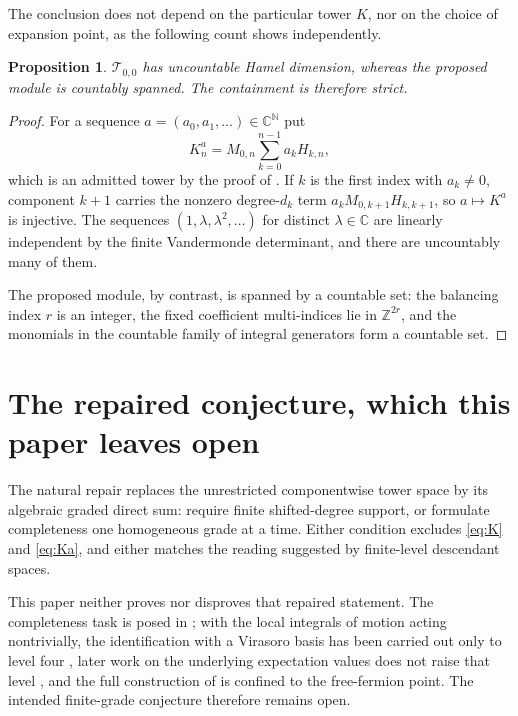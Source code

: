 \documentclass[11pt,reqno]{amsart}
\theoremstyle{plain}
\newtheorem{proposition}[theorem]{Proposition}
\theoremstyle{definition}
\theoremstyle{remark}
\numberwithin{equation}{section}
\begin{document}
The conclusion does not depend on the particular tower $K$, nor on the
choice of expansion point, as the following count shows independently.

\begin{proposition}
  \label{prop:dimension}
  $\mathcal T_{0,0}$ has uncountable Hamel dimension, whereas the proposed
  module is countably spanned. The containment is therefore strict.
\end{proposition}

\begin{proof}
  For a sequence $a=(a_0,a_1,\dots)\in\mathbb C^{\mathbb N}$ put
  \begin{equation}
    \label{eq:Ka}
    K^a_n=M_{0,n}\sum_{k=0}^{n-1}a_kH_{k,n},
  \end{equation}
  which is an admitted tower by the proof of . If $k$ is
  the first index with $a_k\ne0$, component $k+1$ carries the nonzero
  degree-$d_k$ term $a_kM_{0,k+1}H_{k,k+1}$, so $a\mapsto K^a$ is injective.
  The sequences $(1,\lambda,\lambda^2,\dots)$ for distinct
  $\lambda\in\mathbb C$ are linearly independent by the finite Vandermonde
  determinant, and there are uncountably many of them.

  The proposed module, by contrast, is spanned by a countable set: the
  balancing index $r$ is an integer, the fixed coefficient multi-indices lie
  in $\mathbb Z^{2r}$, and the monomials in the countable family of integral
  generators form a countable set.
\end{proof}

\section{The repaired conjecture, which this paper leaves open}
\label{sec:repair}

The natural repair replaces the unrestricted componentwise tower space by
its algebraic graded direct sum: require finite shifted-degree support, or
formulate completeness one homogeneous grade at a time. Either condition
excludes \eqref{eq:K} and \eqref{eq:Ka}, and either matches the reading
suggested by finite-level descendant spaces.

This paper neither proves nor disproves that repaired statement. The
completeness task is posed in \cite{Jimbo_2011fs}; with the local
integrals of motion acting nontrivially, the identification with a Virasoro
basis has been carried out only to level four \cite{Boos_2018nr}, later work
on the underlying expectation values does not raise that level
\cite{Adler_2025fb}, and the full construction of \cite{Adler_2026fb} is
confined to the free-fermion point. The intended finite-grade conjecture therefore remains
open.
\end{document}
